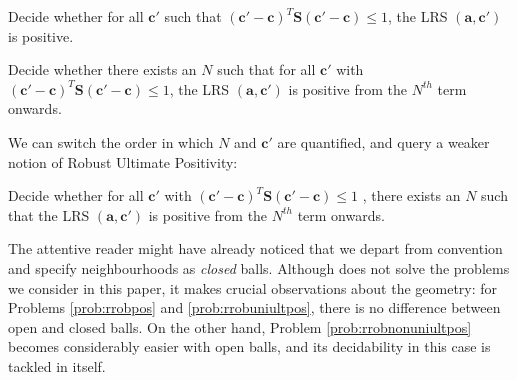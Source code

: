 \begin{problem}
\label{prob:rrobpos}
Decide whether for all $\mathbf{c'}$ such that $(\mathbf{c'} - \mathbf{c})^T\mathbf{S}(\mathbf{c'} - \mathbf{c}) \le 1$, the LRS $(\mathbf{a}, \mathbf{c'})$ is positive.
\end{problem}

\begin{problem}
\label{prob:rrobuniultpos}
Decide whether there exists an $N$ such that for all $\mathbf{c'}$ with $(\mathbf{c'} - \mathbf{c})^T\mathbf{S}(\mathbf{c'} - \mathbf{c}) \le 1$, the LRS $(\mathbf{a}, \mathbf{c'})$ is positive from the $N^{th}$ term onwards.
\end{problem}

We can switch the order in which $N$ and $\mathbf{c'}$ are quantified, and query a weaker notion of Robust Ultimate Positivity:
\begin{problem}
\label{prob:rrobnonuniultpos}
Decide whether for all $\mathbf{c'}$ with $(\mathbf{c'} - \mathbf{c})^T\mathbf{S}(\mathbf{c'} - \mathbf{c}) \le 1$ , there exists an $N$ such that the LRS $(\mathbf{a}, \mathbf{c'})$ is positive from the $N^{th}$ term onwards.
\end{problem}

The attentive reader might have already noticed that we depart from convention and specify neighbourhoods as \textit{closed} balls. Although \cite{originalarxiv} does not solve the problems we consider in this paper, it makes crucial observations about the geometry: for Problems \ref{prob:rrobpos} and \ref{prob:rrobuniultpos}, there is no difference between open and closed balls. On the other hand, Problem \ref{prob:rrobnonuniultpos} becomes considerably easier with open balls, and its decidability in this case is tackled in \cite{originalarxiv} itself. 

